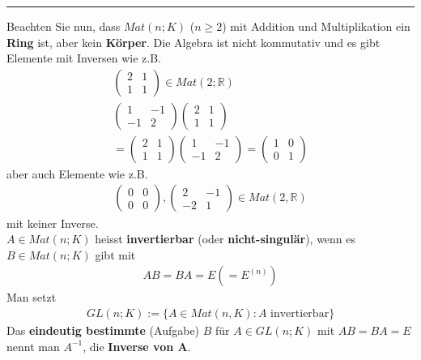 \documentclass[11pt]{report}
\newcommand*\Zb[1] {\mathbb{#1}}
\newcommand*\f[1] {\textbf{#1}}
\begin{document}
\vspace*{0.2cm}\rule{\linewidth}{0.3mm}\vspace{0.2cm}
Beachten Sie nun, dass $Mat(n;K)$ ($n \geq 2$) mit Addition und Multiplikation ein \f{Ring} ist, aber kein \f{Körper}.
Die Algebra ist nicht kommutativ und es gibt Elemente mit Inversen wie z.B.
\begin{align}
 \begin{pmatrix} 2 & 1 \\ 1 & 1\end{pmatrix} \in Mat(2; \Zb{R}) \\
  \begin{pmatrix} 1 & -1 \\ -1 & 2\end{pmatrix}  \begin{pmatrix} 2 & 1 \\ 1 & 1 \end{pmatrix} \\
 =  \begin{pmatrix} 2 & 1 \\ 1 & 1\end{pmatrix}  \begin{pmatrix} 1 & -1 \\ -1 & 2\end{pmatrix} =  \begin{pmatrix} 1 & 0 \\ 0 & 1\end{pmatrix}
\end{align}
aber auch Elemente wie z.B.
\begin{align}
  \begin{pmatrix} 0 & 0 \\ 0 & 0 \end{pmatrix},  \begin{pmatrix} 2 & -1 \\ -2 & 1 \end{pmatrix} \in Mat(2, \Zb{R})
\end{align}
mit keiner Inverse.\\
$A \in Mat(n;K)$ heisst \f{invertierbar} (oder \f{nicht-singulär}), wenn es $B \in Mat(n;K)$ gibt mit
\begin{align}
 AB = BA = E (=E^{(n)}) 
\end{align}
Man setzt
\begin{align}
GL(n;K) := \{A \in Mat(n,K): A \text{ invertierbar}\} 
\end{align}
Das \f{eindeutig bestimmte} (Aufgabe) $B$ für $A \in GL(n;K)$ mit $AB = BA = E$ nennt man $A^{-1}$, die \f{Inverse von A}.
\end{document}
